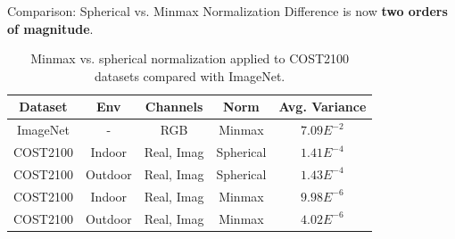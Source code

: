 \documentclass{beamer}
\begin{document}
    \begin{frame}{Comparison: Spherical vs. Minmax Normalization}
    Difference is now \textbf{two orders of magnitude}.
    \begin{table}[htb]
      \footnotesize{
      \begin{center}
        \begin{tabular}{|c|c|c|c|c|}
        \hline
        \textbf{Dataset} & \textbf{Env} & \textbf{Channels} & \textbf{Norm} & \textbf{Avg. Variance} \\ \hline
        ImageNet         & -                    & RGB                 & Minmax                 & \underline{$7.09E^{-2}$}       \\ \hline
        COST2100         & Indoor               & Real, Imag          & Spherical              & \underline{$1.41E^{-4}$}       \\ \hline
        COST2100         & Outdoor              & Real, Imag          & Spherical              & \underline{$1.43E^{-4}$}       \\ \hline
        COST2100         & Indoor               & Real, Imag          & Minmax                 & $9.98E^{-6}$       \\ \hline
        COST2100         & Outdoor              & Real, Imag          & Minmax                 & $4.02E^{-6}$       \\ \hline
        \end{tabular}
        \caption{Minmax vs. spherical normalization applied to COST2100 datasets compared with ImageNet.}
        \label{tab:minmax-sph-compare} 
      \end{center}
      }
    \end{table}
  \end{frame}

\end{document}
